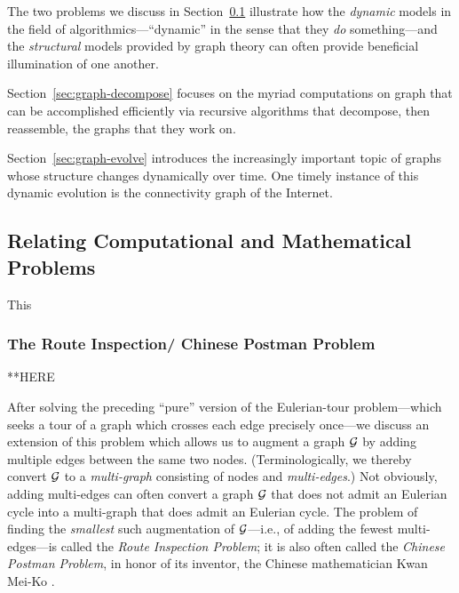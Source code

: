 The two problems we discuss in Section~\ref{sec:Relate-CS-Math-Probs}
illustrate how the {\em dynamic} models in the field of
algorithmics---``dynamic'' in the sense that they {\em do}
something---and the {\em structural} models provided by graph theory
can often provide beneficial illumination of one another.

Section~\ref{sec:graph-decompose} 
 focuses on the myriad computations
on graph that can be accomplished efficiently via recursive algorithms
that decompose, then reassemble, the graphs that they work on.

Section~\ref{sec:graph-evolve} 
introduces the increasingly important topic of graphs whose structure
changes dynamically over time.  One timely instance of this dynamic
evolution is the connectivity graph of the Internet.




\subsection{Relating Computational and Mathematical Problems}
\label{sec:Relate-CS-Math-Probs}

This 



\subsubsection{The Route Inspection/ Chinese Postman Problem}
\label{sec:chinesePostman}

**HERE

After solving the preceding ``pure'' version of the Eulerian-tour
problem---which seeks a tour of a graph which crosses each edge
precisely once---we discuss an extension of this problem which allows
us to augment a graph $\mbox{$\cal G$}$ by adding multiple edges between the same
two nodes.  (Terminologically, we thereby convert $\mbox{$\cal G$}$ to a {\it
  multi-graph}  
consisting of nodes and {\it multi-edges}.)  Not
obviously, adding multi-edges can often convert a graph $\mbox{$\cal G$}$ that does
not admit an Eulerian cycle into a multi-graph that does admit an
Eulerian cycle.  The problem of finding the {\em smallest} such
augmentation of $\mbox{$\cal G$}$---i.e., of adding the fewest multi-edges---is
called the  {\it Route Inspection
  Problem}; it is also often called the {\it Chinese Postman Problem},
 in honor of its inventor, the Chinese
mathematician Kwan Mei-Ko  \cite{Kwan60}.




